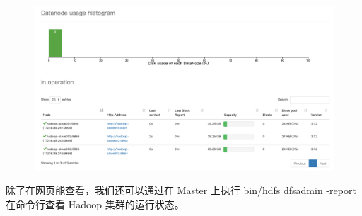\documentclass{article}
\begin{document}
\begin{figure}[!ht]
\centering
\includegraphics[scale=0.3]{image/3.png}
\end{figure}

除了在网页能查看，我们还可以通过在 Master 上执行 bin/hdfs dfsadmin -report 在命令行查看 Hadoop 集群的运行状态。
\end{document}
